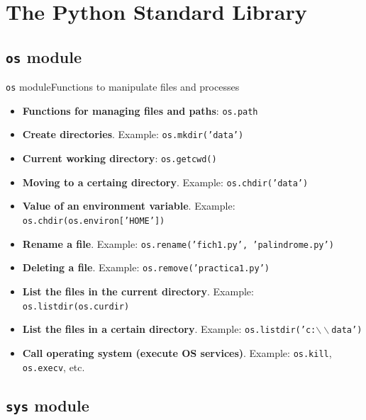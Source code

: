 \documentclass[10pt,compress]{beamer} %
\begin{document}
\section{The Python Standard Library}

\subsection{\texttt{os} module}

\begin{frame}{\texttt{os} module}{Functions to manipulate files and processes}
\vspace{-0.2cm}
\footnotesize{
\begin{block}{}
\vspace{-0.15cm}

\begin{itemize}			
\item \textbf{Functions for managing files and paths}: \texttt{os.path}
\item \textbf{Create directories}. Example: \texttt{os.mkdir('data')}
\item \textbf{Current working directory}: \texttt{os.getcwd()}
\item \textbf{Moving to a certaing directory}. Example: \texttt{os.chdir('data')}
\item \textbf{Value of an environment variable}. Example: \texttt{os.chdir(os.environ['HOME'])}
\item \textbf{Rename a file}. Example: \texttt{os.rename('fich1.py', 'palindrome.py')}
\item \textbf{Deleting a file}. Example: \texttt{os.remove('practica1.py')}
\item \textbf{List the files in the current directory}. Example: \texttt{os.listdir(os.curdir)}
\item \textbf{List the files in a certain directory}. Example: \texttt{os.listdir('c:$\backslash\backslash$data')}
\item \textbf{Call operating system (execute OS services)}. Example: \texttt{os.kill}, \texttt{os.execv}, etc.
\vspace{-0.1cm}
\end{itemize}

\end{block}	
}
\end{frame}

\subsection{\texttt{sys} module}
\end{document}
